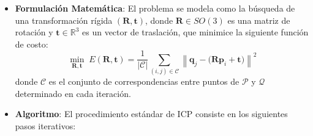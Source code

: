 \documentclass[12pt, a4paper, twoside]{article}
\begin{document}
\begin{itemize}
  \begin{itemize}
    \item \textbf{Formulación Matemática}: El problema se modela como la búsqueda de una transformación rígida $(\mathbf{R}, \mathbf{t})$, donde $\mathbf{R} \in SO(3)$ es 
    una matriz de rotación y $\mathbf{t} \in \mathbb{R}^3$ es un vector de traslación, que minimice la siguiente función de costo:
    \[
    \min_{\mathbf{R}, \mathbf{t}} \; 
    E(\mathbf{R}, \mathbf{t}) =
    \frac{1}{|\mathcal{C}|} \sum_{(i,j) \in \mathcal{C}}
    \left\| \mathbf{q}_j - \big(\mathbf{R}\mathbf{p}_i + \mathbf{t}\big) \right\|^2
    \]
    donde $\mathcal{C}$ es el conjunto de correspondencias entre puntos de $\mathcal{P}$ y $\mathcal{Q}$ determinado en cada iteración.  
  
    \item \textbf{Algoritmo}: El procedimiento estándar de ICP consiste en los siguientes pasos iterativos:
  

\end{itemize}
\end{itemize}
\end{document}
